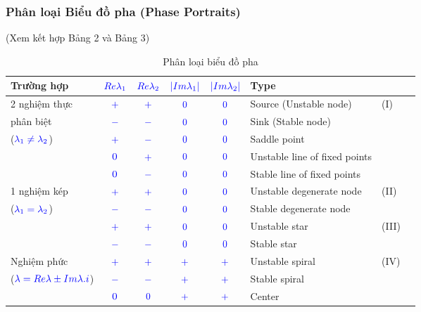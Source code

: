 \documentclass[a4paper]{article}
\begin{document}
    \subsubsection{Phân loại Biểu đồ pha (Phase Portraits)}
    (Xem kết hợp Bảng 2 và Bảng 3)
    \begin{table}[!htp]
        \centering
        \begin{tabular}{lcccclll}
        \toprule
        {\bfseries Trường hợp} & $\textcolor{blue}{Re \lambda\sb{1}}$ & $\textcolor{blue}{Re \lambda\sb{2}}$ & $\textcolor{blue}{|Im \lambda\sb{1}|}$ & $\textcolor{blue}{|Im \lambda\sb{2}|}$ & {\bfseries Type} & \\
        \toprule
        2 nghiệm thực & $\textcolor{blue}{+}$ & $\textcolor{blue}{+}$ & $\textcolor{blue}{0}$ & $\textcolor{blue}{0}$ & Source (Unstable node) & (I)\\
        phân biệt & $\textcolor{blue}{-}$ & $\textcolor{blue}{-}$ & $\textcolor{blue}{0}$ & $\textcolor{blue}{0}$ & Sink (Stable node)\\
        ($\textcolor{blue}{\lambda\sb{1} \neq \lambda\sb{2}}$) & $\textcolor{blue}{+}$ & $\textcolor{blue}{-}$ & $\textcolor{blue}{0}$ & $\textcolor{blue}{0}$ & Saddle point\\
        & $\textcolor{blue}{0}$ & $\textcolor{blue}{+}$ & $\textcolor{blue}{0}$ & $\textcolor{blue}{0}$ & Unstable line of fixed points\\
        & $\textcolor{blue}{0}$ & $\textcolor{blue}{-}$ & $\textcolor{blue}{0}$ & $\textcolor{blue}{0}$ & Stable line of fixed points\\
        \midrule
        1 nghiệm kép & $\textcolor{blue}{+}$ & $\textcolor{blue}{+}$ & $\textcolor{blue}{0}$ & $\textcolor{blue}{0}$ & Unstable degenerate node & (II)\\
        ($\textcolor{blue}{\lambda\sb{1} = \lambda\sb{2}}$) & $\textcolor{blue}{-}$ & $\textcolor{blue}{-}$ & $\textcolor{blue}{0}$ & $\textcolor{blue}{0}$ & Stable degenerate node\\
        \cmidrule{2-7}
        & $\textcolor{blue}{+}$ & $\textcolor{blue}{+}$ & $\textcolor{blue}{0}$ & $\textcolor{blue}{0}$ & Unstable star & (III)\\
        & $\textcolor{blue}{-}$ & $\textcolor{blue}{-}$ & $\textcolor{blue}{0}$ & $\textcolor{blue}{0}$ & Stable star\\
        \midrule
        Nghiệm phức & $\textcolor{blue}{+}$ & $\textcolor{blue}{+}$ & $\textcolor{blue}{+}$ & $\textcolor{blue}{+}$ & Unstable spiral & (IV)\\
        ($\textcolor{blue}{\lambda = Re \lambda \pm Im \lambda .i}$) & $\textcolor{blue}{-}$ & $\textcolor{blue}{-}$ & $\textcolor{blue}{+}$ & $\textcolor{blue}{+}$ & Stable spiral\\
        & $\textcolor{blue}{0}$ & $\textcolor{blue}{0}$ & $\textcolor{blue}{+}$ & $\textcolor{blue}{+}$ & Center\\
        \bottomrule
        \end{tabular}
        \caption{Phân loại biểu đồ pha}
        \label{tab:my_label}
    \end{table}
    
\end{document}
